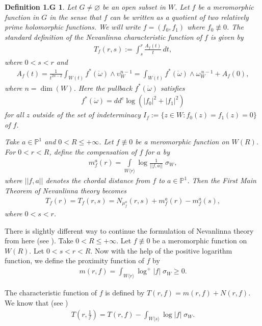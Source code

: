 \documentclass[11pt,reqno]{amsart}
\newtheorem*{defi1G}{Definition 1.G}
\numberwithin{equation}{section}
\begin{document}
\begin{defi1G}\cite[pp. 16-17]{Stoll-1974}
Let $G\neq \varnothing$ be an open subset in $W$. Let $f$ be a meromorphic function in $G$ in the sense that $f$ can be written as a quotient of two relatively prime holomorphic functions. We will write $f = (f_0, f_1)$ where $f_0 \not\equiv 0$. The standard definition of the Nevanlinna characteristic function of $f$ is given by
\begin{align*}
T_f(r,s) := \int_s^r \frac{A_f(t)}{t}\, dt,
\end{align*}
where $0 < s < r$ and
\begin{align*}
A_f(t)
= \frac{1}{t^{2n-2}} \int_{W(t)} f^*(\ddot{\omega}) \wedge \upsilon_W^{n-1}
= \int_{W(t)} f^*(\ddot{\omega}) \wedge \omega_W^{\,n-1} + A_f(0),
\end{align*}
where $n=\dim(W)$.
Here the pullback $f^*(\ddot{\omega})$ satisfies
\begin{align*}
f^*(\ddot{\omega}) = dd^c \log\left( |f_0|^2 + |f_1|^2 \right)
\end{align*}
for all $z$ outside of the set of indeterminacy $I_f:= \{ z \in W : f_0(z) = f_1(z) = 0 \}$ of $f$.

Take $a\in \mathbb{P}^1$ and $0<R\leq +\infty$. Let $f\not\equiv 0$ be a meromorphic function on $W(R)$.
For $0<r<R$, define the compensation of $f$ for $a$ by
\begin{align*}
m^a_f(r)=\int\limits_{W\langle r\rangle}\log \frac{1}{||f,a||} \;\sigma_W,
\end{align*}
where $||f,a||$ denotes the chordal distance from $f$ to $a\in\mathbb{P}^1$.
Then the First Main Theorem of Nevanlinna theory becomes
\begin{align*}
T_f(r)=T_f(r,s)=N_{\mu^a_f}(r,s)+m^a_f(r)-m^a_f(s),
\end{align*}
where $0<s<r$.	
\end{defi1G}

There is slightly different way to continue the formulation of Nevanlinna theory from here (see \cite[pp.15]{Hu-Li-Yang-2003}).
Take $0<R\leq +\infty$. Let $f\not\equiv 0$ be a meromorphic function on $W(R)$. Let $0<s<r<R$. 
Now with the help of the positive logarithm function, we define the proximity function of $f$ by
\begin{align*}
\displaystyle m(r, f)=\int_{W\langle r\rangle} \log^+ |f|\;\sigma_W \geq  0.
\end{align*}

The characteristic function of $f$ is defined by $T(r,f)=m(r,f)+N(r,f)$. We know that (see \cite[pp.15]{Hu-Li-Yang-2003})
\begin{align*}
\displaystyle T\left(r,\frac{1}{f}\right)=T(r,f)-\int_{W\langle s\rangle} \log |f|\;\sigma_W.
\end{align*}
\end{document}
